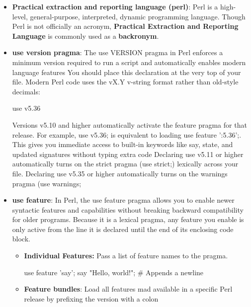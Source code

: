 \documentclass{report}
\begin{document}
    \begin{itemize}
        \item \textbf{Practical extraction and reporting language (perl)}: Perl is a high-level, general-purpose, interpreted, dynamic programming language. Though Perl is not officially an acronym, \textbf{Practical Extraction and Reporting Language} is commonly used as a \textbf{backronym}.
        \item \textbf{use version pragma}: The use VERSION pragma in Perl enforces a minimum version required to run a script and automatically enables modern language features 
            \bigbreak \noindent 
            You should place this declaration at the very top of your file. Modern Perl code uses the vX.Y v-string format rather than old-style decimals:
            \begin{perlcode}
                use v5.36
            \end{perlcode}
            \bigbreak \noindent 
            Versions v5.10 and higher automatically activate the feature pragma for that release. For example, use v5.36; is equivalent to loading use feature ':5.36';. This gives you immediate access to built-in keywords like say, state, and updated signatures without typing extra code
            \bigbreak \noindent 
            Declaring use v5.11 or higher automatically turns on the strict pragma (use strict;) lexically across your file.
            \bigbreak \noindent 
            Declaring use v5.35 or higher automatically turns on the warnings pragma (use warnings;
        \item \textbf{use feature}: In Perl, the use feature pragma allows you to enable newer syntactic features and capabilities without breaking backward compatibility for older programs. Because it is a lexical pragma, any feature you enable is only active from the line it is declared until the end of its enclosing code block.
            \begin{itemize}
                \item \textbf{Individual Features:} Pass a list of feature names to the pragma.
                    \bigbreak \noindent 
                    \begin{perlcode}
                        use feature 'say';                        
                        say "Hello, world!"; # Appends a newline
                    \end{perlcode}
                \item \textbf{Feature bundles}: Load all features mad available in a specific Perl release by prefixing the version with a colon

\end{itemize}
\end{itemize}
\end{document}
